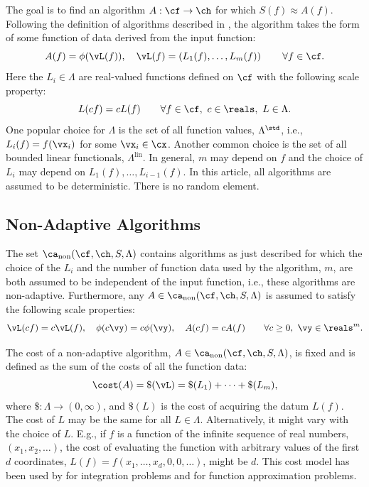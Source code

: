 \documentclass[]{elsarticle}
\DeclareMathOperator{\lin}{lin}
\DeclareMathOperator{\fix}{non}
\theoremstyle{definition}
\theoremstyle{remark}
\begin{document}
The goal is to find an algorithm $A:\cf \to \ch$ for which $S(f) \approx A(f)$. Following the definition of algorithms described in \cite[Section 3.2]{TraWasWoz88}, the algorithm takes the form of some function of data derived from the input function:
\begin{equation}
\label{algoform}
A(f) =  \phi(\vL(f)), \quad \vL(f) = \left(L_1(f), \ldots, L_m(f)\right) \qquad \forall f \in \cf.
\end{equation}
Here the $L_i \in \Lambda$ are real-valued functions defined on $\cf$ with the following scale property:
\begin{equation}
\label{dataassump}
L(cf) = cL(f) \qquad \forall f \in \cf, \ c \in \reals, \ L \in \Lambda.
\end{equation}
One popular choice for $\Lambda$ is the set of all function values, $\Lambda^{\std}$, i.e., $L_i(f) = f(\vx_i)$ for some $\vx_i \in \cx$.  Another common choice is the set of all bounded linear functionals, $\Lambda^{\lin}$.  In general, $m$ may depend on $f$ and the choice of $L_i$ may depend on $L_1(f), \ldots, L_{i-1}(f)$.  In this article, all algorithms are assumed to be deterministic.  There is no random element.

\subsection{Non-Adaptive Algorithms}

The set $\ca_{\fix}(\cf,\ch,S,\Lambda)$ contains algorithms as just described for which the choice of the $L_i$ and the number of function data used by the algorithm, $m$, are both assumed to be independent of the input function, i.e., these algorithms are non-adaptive.  Furthermore, any $A \in \ca_{\fix}(\cf,\ch,S,\Lambda)$ is assumed to satisfy the following scale properties:
\begin{equation}
\label{algoscale}
\vL(cf) = c \vL(f), \quad 
\phi(c\vy) = c\phi(\vy), \quad A(cf) = cA(f) \qquad \forall c \ge 0, \ \vy \in \reals^m.
\end{equation}

The cost of a non-adaptive algorithm, $A \in  \ca_{\fix}(\cf,\ch,S,\Lambda)$, is fixed and is defined as the sum of the costs of all the function data:
\begin{equation} \label{costfix}
\cost(A) = \$(\vL) = \$(L_1) + \cdots +\$(L_m),
\end{equation}
where $\$:\Lambda \to (0,\infty)$, and $\$(L)$ is the cost of acquiring the datum $L(f)$. The cost of $L$ may be the same for all $L \in \Lambda$.  Alternatively, it might vary with the choice of $L$.  E.g., if $f$ is a function of the infinite sequence of real numbers, $(x_1, x_2, \ldots)$, the cost of evaluating the function with arbitrary values of the first $d$ coordinates, $L(f)=f(x_1, \ldots, x_d, 0, 0, \ldots)$, might be $d$.  This cost model has been used by \cite{HicMGRitNiu09a,KuoEtal10a,NiuHic09a,NiuHic09b,PlaWas11a} for integration problems and \cite{Was13a,WasWoz11a,WasWoz11b} for function approximation problems.
\end{document}
